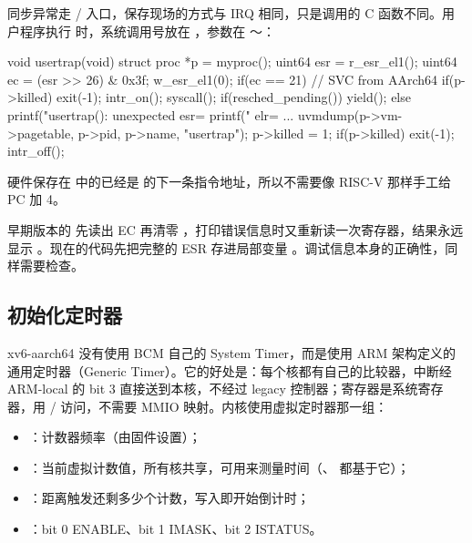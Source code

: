 同步异常走 / 入口，保存现场的方式与 IRQ 相同，只是调用的 C 函数不同。用户程序执行  时，系统调用号放在 ，参数在 ～：


\begin{ccode}
void usertrap(void)
{
  struct proc *p = myproc();
  uint64 esr = r_esr_el1();
  uint64 ec = (esr >> 26) & 0x3f;
  w_esr_el1(0);
  if(ec == 21){                         // SVC from AArch64
    if(p->killed) exit(-1);
    intr_on();
    syscall();
    if(resched_pending()) yield();
  } else {
    printf("usertrap(): unexpected esr=%
    printf("            elr=%
    ...
    uvmdump(p->vm->pagetable, p->pid, p->name, "usertrap");
    p->killed = 1;
  }
  if(p->killed) exit(-1);
  intr_off();
}
\end{ccode}

硬件保存在  中的已经是  的下一条指令地址，所以不需要像 RISC-V 那样手工给 PC 加 4。

\begin{note}
  早期版本的  先读出 EC 再清零 ，打印错误信息时又重新读一次寄存器，结果永远显示 。现在的代码先把完整的 ESR 存进局部变量 。调试信息本身的正确性，同样需要检查。
\end{note}

\subsection{初始化定时器}

xv6-aarch64 没有使用 BCM 自己的 System Timer，而是使用 ARM 架构定义的通用定时器（Generic Timer）。它的好处是：每个核都有自己的比较器，中断经 ARM-local 的 bit 3 直接送到本核，不经过 legacy 控制器；寄存器是系统寄存器，用 / 访问，不需要 MMIO 映射。内核使用虚拟定时器那一组：

\begin{itemize}
  \item {}：计数器频率（由固件设置）；
  \item {}：当前虚拟计数值，所有核共享，可用来测量时间（、 都基于它）；
  \item {}：距离触发还剩多少个计数，写入即开始倒计时；
  \item {}：bit 0 ENABLE、bit 1 IMASK、bit 2 ISTATUS。
\end{itemize}


